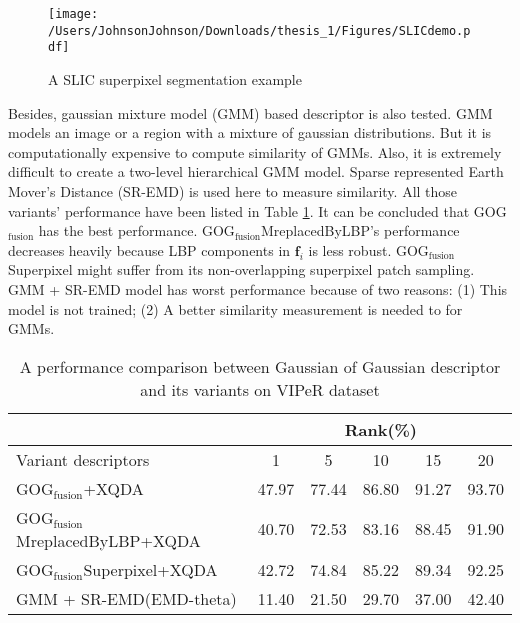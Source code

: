 \begin{figure}[H]
\begin{raggedleft}
\texttt{[image: /Users/JohnsonJohnson/Downloads/thesis\_1/Figures/SLICdemo.pdf]}
\vspace{-3em}
\caption{A SLIC superpixel segmentation example}
\label{SLICdemoCUHK}
\end{raggedleft}
\end{figure}

Besides, gaussian mixture model (GMM) based descriptor is also tested. GMM models an image or a region with a mixture of gaussian distributions. But it is computationally expensive to compute similarity of GMMs. Also, it is extremely difficult to create a two-level hierarchical GMM model. Sparse represented Earth Mover's Distance (SR-EMD) \cite{novelEMD} is used here to measure similarity. All those variants' performance have been listed in Table \ref{VariantsComparison}. It can be concluded that GOG$_\text{fusion}$ has the best performance. GOG$_\text{fusion}$MreplacedByLBP's performance decreases heavily because LBP components in $\bm{f}_i$ is less robust. GOG$_\text{fusion}$Superpixel might suffer from its non-overlapping superpixel patch sampling. GMM + SR-EMD model has worst performance because of two reasons: (1) This model is not trained; (2) A better similarity measurement is needed to for GMMs.
\begin{table}[H]
\centering
\caption{A performance comparison between Gaussian of Gaussian descriptor and its variants on VIPeR dataset}
\label{VariantsComparison}
\begin{tabular}{|l|c|c|c|c|c|}
\hline
& \multicolumn{5}{|c|}{Rank(\%)}\\
\hline
Variant descriptors & 1&5&10&15&20\\
\hline
GOG$_\text{fusion}$+XQDA & 47.97& 77.44&86.80 &91.27 &93.70 \\ 
\hline
GOG$_\text{fusion}$MreplacedByLBP+XQDA & 40.70&72.53 &83.16 &88.45 &91.90 \\ %
\hline
GOG$_\text{fusion}$Superpixel+XQDA &42.72 &74.84 & 85.22&89.34& 92.25\\ %
\hline
GMM + SR-EMD(EMD-theta) &11.40 &21.50 &29.70 &37.00 &42.40 \\ %
\hline
\end{tabular}
\end{table}



